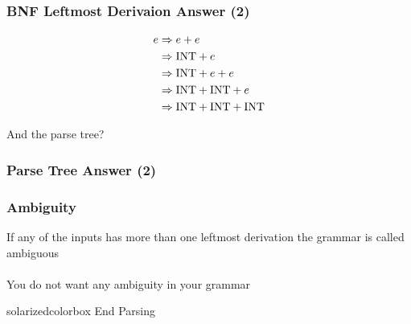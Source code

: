 \documentclass[aspectratio=169]{beamer}
\begin{document}
\begin{frame}
\frametitle{BNF Leftmost Derivaion Answer (2)}

\begin{align*}
e &\Rightarrow e + e\\
  &\Rightarrow \text{\lstinline{INT}} + e\\
  &\Rightarrow \text{\lstinline{INT}} + e + e\\
  &\Rightarrow \text{\lstinline{INT}} + \text{\lstinline{INT}} + e\\
  &\Rightarrow \text{\lstinline{INT}} + \text{\lstinline{INT}} +
               \text{\lstinline{INT}}
\end{align*}

And the parse tree?
\end{frame}

\begin{frame}
\frametitle{Parse Tree Answer (2)}

\begin{center}
\end{center}
\end{frame}

\begin{frame}
\frametitle{Ambiguity}

If any of the inputs has more than one leftmost derivation the \alert{grammar}
is called \alert{ambiguous}\\~\\

You do not want any ambiguity in your grammar
\end{frame}

\begin{frame}
  \begin{beamercolorbox}[wd=\paperwidth, sep=2em]{solarizedcolorbox}
    {End Parsing}
  \end{beamercolorbox}
\end{frame}
\end{document}
